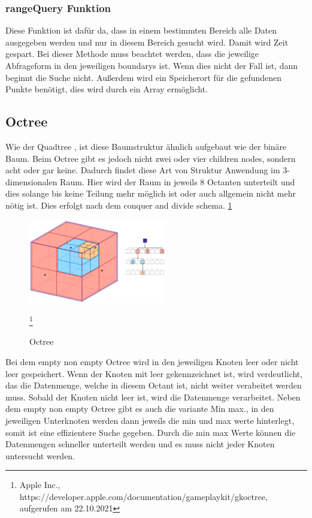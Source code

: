 \documentclass[11pt]{article}
\newcommand{\qt}{Quadtree }
\newcommand{\oc}{Octree }
\newcommand{\fett}[1]{{\bf #1}}
\begin{document}
\subsubsection{rangeQuery Funktion} \label{QuerySuche}
Diese Funktion ist dafür da, dass in einem bestimmten Bereich alle Daten ausgegeben werden und nur in diesem Bereich gesucht wird. Damit wird Zeit gespart. Bei dieser Methode muss beachtet werden, dass die jeweilige Abfrageform in den jeweiligen boundarys ist. 
Wenn dies nicht der Fall ist, dann beginnt die Suche nicht. \newline
Außerdem wird ein Speicherort für die gefundenen Punkte benötigt, dies wird durch ein Array ermöglicht. 

\pagebreak
\subsection{\fett{\oc}}
Wie der \qt , ist diese Baumstruktur ähnlich aufgebaut wie der binäre Baum. Beim \oc gibt es jedoch nicht zwei oder vier children nodes, sondern acht oder gar keine. Dadurch findet diese Art von Struktur Anwendung im 3-dimensionalen Raum. 
Hier wird der Raum in jeweils 8 Octanten unterteilt und dies solange bis keine Teilung mehr möglich ist oder auch allgemein nicht mehr nötig ist. Dies erfolgt nach dem conquer and divide schema.  \ref{Octreeexample}
\begin{figure}[h]
    \begin{center}
    \includegraphics[width=6cm]{octree.png}
    \caption{Octree}
    \label{Octreeexample} \footnote{Apple Inc., https://developer.apple.com/documentation/gameplaykit/gkoctree, aufgerufen am 22.10.2021}
    
\end{center}
\end{figure}
Bei dem empty non empty \oc wird in den jeweiligen Knoten leer oder nicht leer gespeichert. 
Wenn der Knoten mit leer gekennzeichnet ist, wird verdeutlicht, das die Datenmenge, welche in diesem Octant ist, nicht weiter verabeitet werden muss. 
Sobald der Knoten nicht leer ist, wird die Datenmenge verarbeitet. 
Neben dem empty non empty \oc gibt es auch die variante Min max., in den jeweiligen Unterknoten werden dann jeweils die min und max werte hinterlegt, somit ist eine effizientere Suche gegeben. Durch die min max Werte können die Datenmengen schneller unterteilt werden und es muss nicht jeder Knoten untersucht werden. 
\end{document}
